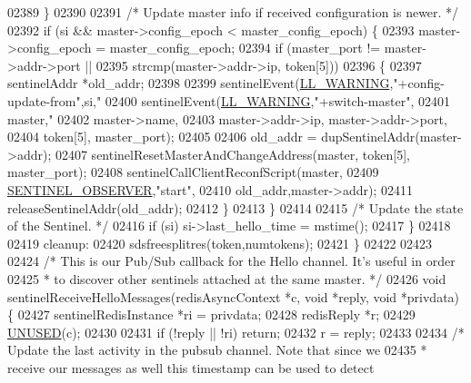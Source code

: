 \begin{DoxyCode}
{{{{{{{{{{{{{{{{{{{{{{{{{{{{{{{{{{{{{{{{{{{{{{{{{{{{02389         \}
02390 
02391         \textcolor{comment}{/* Update master info if received configuration is newer. */}
02392         \textcolor{keywordflow}{if} (si && master->config\_epoch < master\_config\_epoch) \{
02393             master->config\_epoch = master\_config\_epoch;
02394             \textcolor{keywordflow}{if} (master\_port != master->addr->port ||
02395                 strcmp(master->addr->ip, token[5]))
02396             \{
02397                 sentinelAddr *old\_addr;
02398 
02399                 sentinelEvent(\hyperlink{server_8h_a31229b9334bba7d6be2a72970967a14b}{LL\_WARNING},\textcolor{stringliteral}{"+config-update-from"},si,\textcolor{stringliteral}{"%
02400                 sentinelEvent(\hyperlink{server_8h_a31229b9334bba7d6be2a72970967a14b}{LL\_WARNING},\textcolor{stringliteral}{"+switch-master"},
02401                     master,\textcolor{stringliteral}{"%
02402                     master->name,
02403                     master->addr->ip, master->addr->port,
02404                     token[5], master\_port);
02405 
02406                 old\_addr = dupSentinelAddr(master->addr);
02407                 sentinelResetMasterAndChangeAddress(master, token[5], master\_port);
02408                 sentinelCallClientReconfScript(master,
02409                     \hyperlink{sentinel_8c_a762f7fd932aed99946bfca7456027296}{SENTINEL\_OBSERVER},\textcolor{stringliteral}{"start"},
02410                     old\_addr,master->addr);
02411                 releaseSentinelAddr(old\_addr);
02412             \}
02413         \}
02414 
02415         \textcolor{comment}{/* Update the state of the Sentinel. */}
02416         \textcolor{keywordflow}{if} (si) si->last\_hello\_time = mstime();
02417     \}
02418 
02419 cleanup:
02420     sdsfreesplitres(token,numtokens);
02421 \}
02422 
02423 
02424 \textcolor{comment}{/* This is our Pub/Sub callback for the Hello channel. It's useful in order}
02425 \textcolor{comment}{ * to discover other sentinels attached at the same master. */}
02426 \textcolor{keywordtype}{void} sentinelReceiveHelloMessages(redisAsyncContext *c, \textcolor{keywordtype}{void} *reply, \textcolor{keywordtype}{void} *privdata) \{
02427     sentinelRedisInstance *ri = privdata;
02428     redisReply *r;
02429     \hyperlink{server_8h_ae7c9dc8f13568a9c856573751f1ee1ec}{UNUSED}(c);
02430 
02431     \textcolor{keywordflow}{if} (!reply || !ri) \textcolor{keywordflow}{return};
02432     r = reply;
02433 
02434     \textcolor{comment}{/* Update the last activity in the pubsub channel. Note that since we}
02435 \textcolor{comment}{     * receive our messages as well this timestamp can be used to detect}
}}}}}}}}}}}}}}}}}}}}}}}}}}}}}}}}}}}}}}}}}}}}}}}}}}}}}}
\end{DoxyCode}
